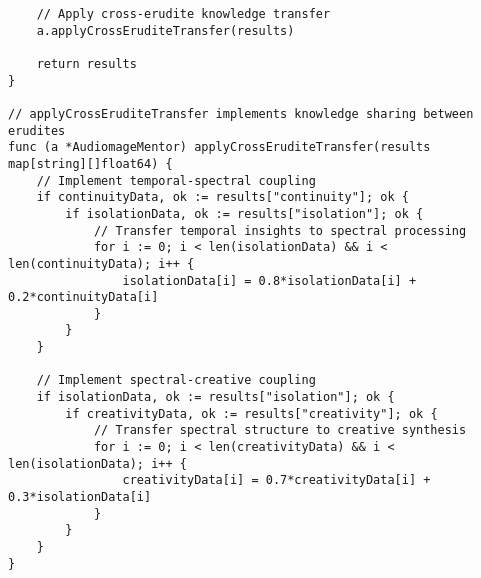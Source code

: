\begin{tcolorbox}[colback=CodeBackground, colframe=DarkGray, title=Audiomage Mentor Implementation, fonttitle=\bfseries]
\begin{verbatim}
    // Apply cross-erudite knowledge transfer
    a.applyCrossEruditeTransfer(results)
    
    return results
}

// applyCrossEruditeTransfer implements knowledge sharing between erudites
func (a *AudiomageMentor) applyCrossEruditeTransfer(results map[string][]float64) {
    // Implement temporal-spectral coupling
    if continuityData, ok := results["continuity"]; ok {
        if isolationData, ok := results["isolation"]; ok {
            // Transfer temporal insights to spectral processing
            for i := 0; i < len(isolationData) && i < len(continuityData); i++ {
                isolationData[i] = 0.8*isolationData[i] + 0.2*continuityData[i]
            }
        }
    }
    
    // Implement spectral-creative coupling
    if isolationData, ok := results["isolation"]; ok {
        if creativityData, ok := results["creativity"]; ok {
            // Transfer spectral structure to creative synthesis
            for i := 0; i < len(creativityData) && i < len(isolationData); i++ {
                creativityData[i] = 0.7*creativityData[i] + 0.3*isolationData[i]
            }
        }
    }
}
\end{verbatim}
\end{tcolorbox}

